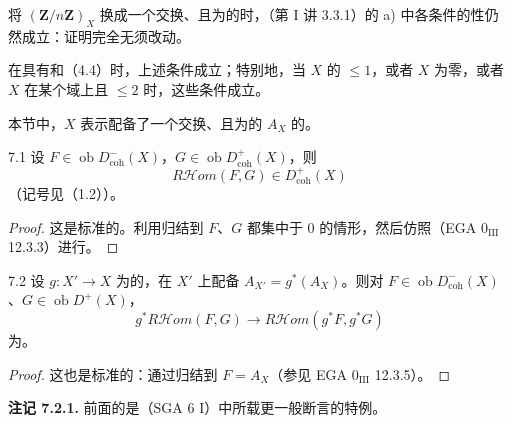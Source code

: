 将 $(\mathbf Z/n\mathbf Z)_X$ 换成一个交换、且为的时，（第 I 讲 3.3.1）的 a) 中各条件的性仍然成立：证明完全无须改动。

在具有和（4.4）时，上述条件成立；特别地，当 $X$ 的 $\leq1$，或者 $X$ 为零，或者 $X$ 在某个域上且 $\leq2$ 时，这些条件成立。

本节中，$X$ 表示配备了一个交换、且为的 $A_X$ 的。

\begin{SGAresult}{}{7.1}
设 $F\in\operatorname{ob}D^-_{\mathrm{coh}}(X)$，$G\in\operatorname{ob}D^+_{\mathrm{coh}}(X)$，则
\[
R\mathcal Hom(F,G)\in D^+_{\mathrm{coh}}(X)
\]
（记号见（1.2））。
\end{SGAresult}
\begin{proof}
这是标准的。利用归结到 $F$、$G$ 都集中于 $0$ 的情形，然后仿照（EGA $0_{\mathrm{III}}$ 12.3.3）进行。
\end{proof}

\begin{SGAresult}{}{7.2}
设 $g:X'\to X$ 为的，在 $X'$ 上配备 $A_{X'}=g^*(A_X)$。则对 $F\in\operatorname{ob}D^-_{\mathrm{coh}}(X)$、$G\in\operatorname{ob}D^+(X)$，
\[
g^*R\mathcal Hom(F,G)\longrightarrow R\mathcal Hom(g^*F,g^*G)
\]
为。
\end{SGAresult}
\begin{proof}
这也是标准的：通过归结到 $F=A_X$（参见 EGA $0_{\mathrm{III}}$ 12.3.5）。
\end{proof}
\textbf{注记 7.2.1.} 前面的是（SGA 6 I）中所载更一般断言的特例。

